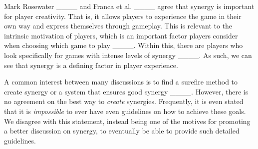 Mark Rosewater ____ and Franca et al. ____ agree that synergy is important for player creativity. That is, it allows players to experience the game in their own way and express themselves through gameplay. This is relevant to the intrinsic motivation of players, which is an important factor players consider when choosing which game to play ____.
Within this, there are players who look specifically for games with intense levels of synergy ____. As such, we can see that synergy is a defining factor in player experience.

A common interest between many discussions is to find a surefire method to create synergy or a system that ensures good synergy ____. However, there is no agreement on the best way to \textit{create} synergies. Frequently, it is even stated that it is \textit{impossible} to ever have even guidelines on how to achieve these goals. We disagree with this statement, instead being one of the motives for promoting a better discussion on synergy, to eventually be able to provide such detailed guidelines.
